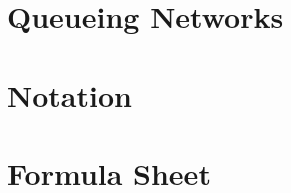\chapter{Queueing Networks}
\label{sec:notes-relat-chapt2}

%


%


%

%







\chapter*{Notation}
\label{sec:notation}


\chapter*{Formula Sheet}




\cleardoublepage
{}
{}
\printindex



